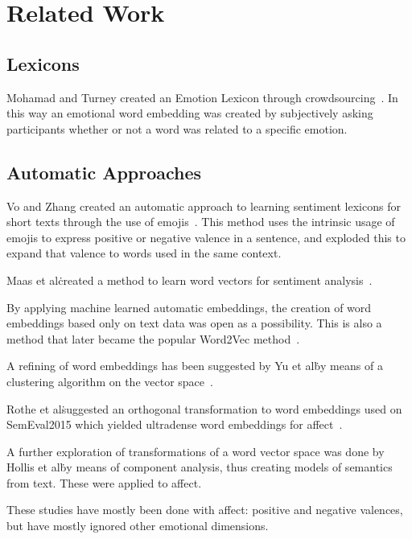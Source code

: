\chapter{Related Work}\label{chap:Related Work}


\section{Lexicons}\label{sec:Lexicons}

Mohamad and Turney created an Emotion Lexicon through crowdsourcing~\cite{mohammad_crowdsourcing_2013}. In this way an emotional word embedding was created by subjectively asking participants whether or not a word was related to a specific emotion.

\section{Automatic Approaches}\label{sec:Automatic Approaches}
Vo and Zhang created an automatic approach to learning sentiment lexicons for short texts through the use of emojis~\cite{vo_dont_2016}. This method uses the intrinsic usage of emojis to express positive or negative valence in a sentence, and exploded this to expand that valence to words used in the same context.

Maas et al\. created a method to learn word vectors for sentiment analysis~\cite{maas_learning_2011}.

By applying machine learned automatic embeddings, the creation of word embeddings based only on text data was open as a possibility. This is also a method that later became the popular Word2Vec method~\cite{mikolov_distributed_2013}.

A refining of word embeddings has been suggested by Yu et al\. by means of a clustering algorithm on the vector space~\cite{yu_refining_2017}.

Rothe et al\. suggested an orthogonal transformation to word embeddings used on SemEval2015 which yielded ultradense word embeddings for affect~\cite{rothe_ultradense_2016}.

A further exploration of transformations of a word vector space was done by Hollis et al\. by means of component analysis, thus creating models of semantics from text. These were applied to affect\cite{hollis_principals_2016}.

These studies have mostly been done with affect: positive and negative valences, but have mostly ignored other emotional dimensions.

